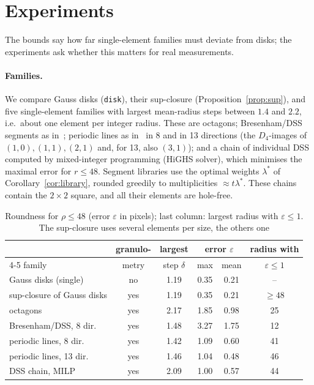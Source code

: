 \documentclass[runningheads]{llncs}
\begin{document}
\section{Experiments}\label{sec:experiments}
The bounds say how far single-element families must deviate from disks; the experiments ask whether this matters for real measurements.

\paragraph{Families.} We compare Gauss disks (\texttt{disk}), their sup-closure (Proposition~\ref{prop:sup}), and five single-element families with largest mean-radius steps between $1.4$ and $2.2$, i.e.\ about one element per integer radius. These are octagons; Bresenham/DSS segments as in~\cite{adams1993}; periodic lines as in~\cite{jones1996} in 8 and in 13 directions (the $D_4$-images of $(1,0),(1,1),(2,1)$ and, for 13, also $(3,1)$); and a chain of individual DSS computed by mixed-integer programming (HiGHS solver), which minimises the maximal error for $r\le48$. Segment libraries use the optimal weights $\lambda^\ast$ of Corollary~\ref{cor:library}, rounded greedily to multiplicities $\approx t\lambda^\ast$. These chains contain the $2\times2$ square, and all their elements are hole-free.

\begin{table}[t]
\centering
\caption{Roundness for $\rho\le48$ (error $\varepsilon$ in pixels); last column: largest radius with $\varepsilon\le1$. The sup-closure uses several elements per size, the others one}\label{tab:families}
\begin{tabular}{lccccc}
\toprule
 & granulo- & largest & \multicolumn{2}{c}{error $\varepsilon$} & radius with\\
\cmidrule(lr){4-5}
family & metry & step $\delta$ & max & mean & $\varepsilon\le1$\\
\midrule
Gauss disks (single) & no & 1.19 & 0.35 & 0.21 & --\\
sup-closure of Gauss disks & yes & 1.19 & 0.35 & 0.21 & $\ge48$\\
octagons & yes & 2.17 & 1.85 & 0.98 & 25\\
Bresenham/DSS, 8 dir. & yes & 1.48 & 3.27 & 1.75 & 12\\
periodic lines, 8 dir. & yes & 1.42 & 1.09 & 0.60 & 41\\
periodic lines, 13 dir. & yes & 1.46 & 1.04 & 0.48 & 46\\
DSS chain, MILP & yes & 2.09 & 1.00 & 0.57 & 44\\
\bottomrule
\end{tabular}
\end{table}
\end{document}
